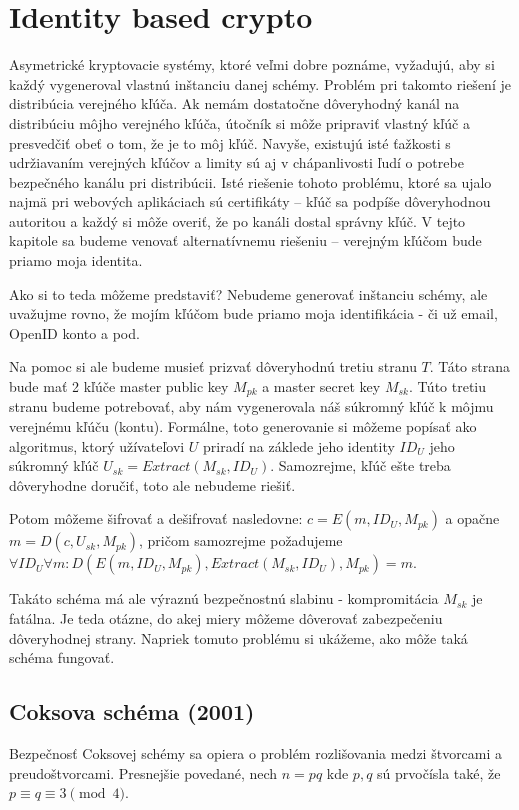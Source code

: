\section{Identity based crypto}

Asymetrické kryptovacie systémy, ktoré veľmi dobre poznáme, vyžadujú,
aby si každý vygeneroval vlastnú inštanciu danej schémy. Problém pri
takomto riešení je distribúcia verejného kľúča. Ak nemám dostatočne
dôveryhodný kanál na distribúciu môjho verejného kľúča, útočník si
môže pripraviť vlastný kľúč a presvedčiť obeť o tom, že je to môj
kľúč. Navyše, existujú isté ťažkosti s udržiavaním verejných kľúčov a
limity sú aj v chápanlivosti ľudí o potrebe bezpečného kanálu pri
distribúcii.
Isté riešenie tohoto problému,
ktoré sa ujalo najmä pri webových aplikáciach sú certifikáty --
kľúč sa podpíše dôveryhodnou autoritou a každý si môže
overiť, že po kanáli dostal správny kľúč. V tejto kapitole sa budeme
venovať alternatívnemu riešeniu -- verejným kľúčom bude priamo moja
identita.

Ako si to teda môžeme predstaviť? Nebudeme generovať inštanciu schémy,
ale uvažujme rovno, že mojím kľúčom bude priamo moja identifikácia -
či už email, OpenID konto a pod.

Na pomoc si ale budeme musieť prizvať dôveryhodnú tretiu stranu $T$.
Táto strana bude mať 2 kľúče master public key $M_{pk}$ a master
secret key $M_{sk}$. Túto tretiu stranu budeme potrebovať, aby nám
vygenerovala náš súkromný kľúč k môjmu verejnému kľúču (kontu).
Formálne, toto generovanie si môžeme popísať ako algoritmus, ktorý
užívateľovi $U$ priradí na záklede jeho identity $ID_U$ jeho súkromný
kľúč $U_{sk} = Extract(M_{sk}, ID_U)$. Samozrejme, kľúč ešte treba
dôveryhodne doručiť, toto ale nebudeme riešiť.

Potom môžeme šifrovať a dešifrovať nasledovne:
$c=E(m,ID_U,M_{pk})$ a opačne $m = D(c, U_{sk}, M_{pk})$, pričom
samozrejme požadujeme
$\forall ID_U \forall m: D(E(m, ID_U, M_{pk}), Extract(M_{sk},ID_U),
M_{pk})=m$.

Takáto schéma má ale výraznú bezpečnostnú slabinu - kompromitácia
$M_{sk}$ je fatálna. Je teda otázne, do akej miery môžeme dôverovať
zabezpečeniu dôveryhodnej strany. Napriek tomuto problému si ukážeme,
ako môže taká schéma fungovať.

\subsection{Coksova schéma (2001)}

Bezpečnosť Coksovej schémy sa opiera o problém rozlišovania medzi
štvorcami a preudoštvorcami. Presnejšie povedané,
nech $n=pq$ kde $p,q$ sú prvočísla také, že $p \equiv q \equiv 3 \pmod{4}$.

